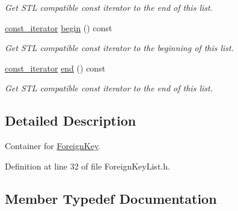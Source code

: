 \begin{DoxyCompactItemize}
\begin{DoxyCompactList}\small\item\em Get S\+TL compatible const iterator to the end of this list. \end{DoxyCompactList}\item 
\hyperlink{class_mdt_1_1_item_model_1_1_foreign_key_list_a3c761b1204692763e403333043701b6a}{const\+\_\+iterator} \hyperlink{class_mdt_1_1_item_model_1_1_foreign_key_list_a8391ea0f436ee61a2473b9e2c2de848b}{begin} () const \hypertarget{class_mdt_1_1_item_model_1_1_foreign_key_list_a8391ea0f436ee61a2473b9e2c2de848b}{}\label{class_mdt_1_1_item_model_1_1_foreign_key_list_a8391ea0f436ee61a2473b9e2c2de848b}

\begin{DoxyCompactList}\small\item\em Get S\+TL compatible const iterator to the beginning of this list. \end{DoxyCompactList}\item 
\hyperlink{class_mdt_1_1_item_model_1_1_foreign_key_list_a3c761b1204692763e403333043701b6a}{const\+\_\+iterator} \hyperlink{class_mdt_1_1_item_model_1_1_foreign_key_list_ae2da652d1b9a344543e556eda5a73b28}{end} () const \hypertarget{class_mdt_1_1_item_model_1_1_foreign_key_list_ae2da652d1b9a344543e556eda5a73b28}{}\label{class_mdt_1_1_item_model_1_1_foreign_key_list_ae2da652d1b9a344543e556eda5a73b28}

\begin{DoxyCompactList}\small\item\em Get S\+TL compatible const iterator to the end of this list. \end{DoxyCompactList}\end{DoxyCompactItemize}


\subsection{Detailed Description}
Container for \hyperlink{class_mdt_1_1_item_model_1_1_foreign_key}{Foreign\+Key}. 

Definition at line 32 of file Foreign\+Key\+List.\+h.



\subsection{Member Typedef Documentation}
